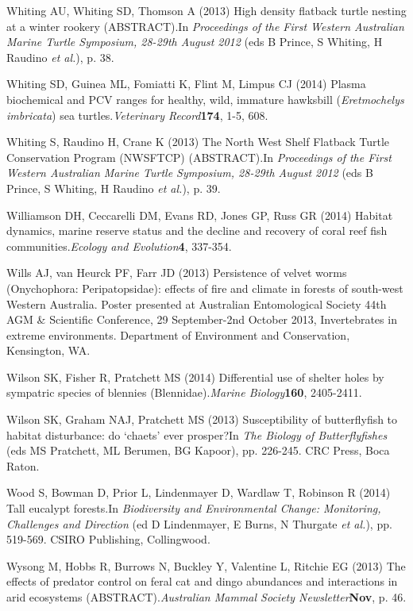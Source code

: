 \documentclass[version=last, paper=a4, DIV=18, usenames, dvipsnames]{scrartcl}
\begin{document}
Whiting AU, Whiting SD, Thomson A (2013) High density flatback turtle nesting at a winter rookery (ABSTRACT).In \emph{Proceedings of the First Western Australian Marine Turtle Symposium, 28-29th August 2012} (eds B Prince, S Whiting, H Raudino \emph{et al.}), p. 38.


Whiting SD, Guinea ML, Fomiatti K, Flint M, Limpus CJ (2014) Plasma biochemical and PCV ranges for healthy, wild, immature hawksbill (\emph{Eretmochelys} \emph{imbricata}) sea turtles.\emph{Veterinary Record}\textbf{174}, 1-5, 608.


Whiting S, Raudino H, Crane K (2013) The North West Shelf Flatback Turtle Conservation Program (NWSFTCP) (ABSTRACT).In \emph{Proceedings of the First Western Australian Marine Turtle Symposium, 28-29th August 2012} (eds B Prince, S Whiting, H Raudino \emph{et al.}), p. 39.


Williamson DH, Ceccarelli DM, Evans RD, Jones GP, Russ GR (2014) Habitat dynamics, marine reserve status and the decline and recovery of coral reef fish communities.\emph{Ecology and Evolution}\textbf{4}, 337-354.


Wills AJ, van Heurck PF, Farr JD (2013) Persistence of velvet worms (Onychophora: Peripatopsidae): effects of fire and climate in forests of south-west Western Australia. Poster presented at Australian Entomological Society 44th AGM \& Scientific Conference, 29 September-2nd October 2013, Invertebrates in extreme environments. Department of Environment and Conservation, Kensington, WA.


Wilson SK, Fisher R, Pratchett MS (2014) Differential use of shelter holes by sympatric species of blennies (Blennidae).\emph{Marine Biology}\textbf{160}, 2405-2411.


Wilson SK, Graham NAJ, Pratchett MS (2013) Susceptibility of butterflyfish to habitat disturbance: do `chaets' ever prosper?In \emph{The Biology of Butterflyfishes} (eds MS Pratchett, ML Berumen, BG Kapoor), pp. 226-245. CRC Press, Boca Raton.


Wood S, Bowman D, Prior L, Lindenmayer D, Wardlaw T, Robinson R (2014) Tall eucalypt forests.In \emph{Biodiversity and Environmental Change: Monitoring, Challenges and Direction} (ed D Lindenmayer, E Burns, N Thurgate \emph{et al.}), pp. 519-569. CSIRO Publishing, Collingwood.


Wysong M, Hobbs R, Burrows N, Buckley Y, Valentine L, Ritchie EG (2013) The effects of predator control on feral cat and dingo abundances and interactions in arid ecosystems (ABSTRACT).\emph{Australian Mammal Society Newsletter}\textbf{Nov}, p. 46.
\end{document}
